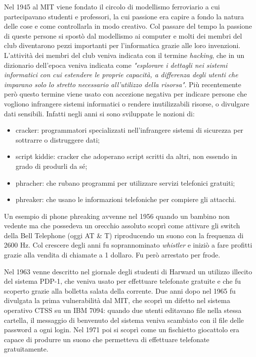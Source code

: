 Nel 1945 al MIT viene fondato il circolo di modellismo ferroviario a cui partecipavano studenti e professori, la cui passione era capire a fondo la natura delle cose e come controllarla in modo creativo. Col passare del tempo la passione di queste persone si spostò dal modellismo ai computer e molti dei membri del club diventarono pezzi importanti per l'informatica grazie alle loro invenzioni. L'attività dei membri del club veniva indicata con il termine \textit{hacking}, che in un dizionario dell'epoca veniva indicata come \textit{"esplorare i dettagli nei sistemi informatici con cui estendere le proprie capacità, a differenza degli utenti che imparano solo lo stretto necessario all'utilizzo della risorsa"}.  Più recentemente però questo termine viene usato con accezione negativa per indicare persone che vogliono infrangere sistemi informatici o rendere inutilizzabili risorse, o divulgare dati sensibili. Infatti negli anni si sono sviluppate le nozioni di:
\begin{itemize}
    \item cracker: programmatori specializzati nell'infrangere sistemi di sicurezza per sottrarre o distruggere dati;
    \item script kiddie: cracker che adoperano script scritti da altri, non essendo in grado di produrli da sé;
    \item phracher: che rubano programmi per utilizzare servizi telefonici gratuiti;
    \item phreaker: che usano le informazioni telefoniche per compiere gli attacchi.
\end{itemize}
Un esempio di phone phreaking avvenne nel 1956 quando un bambino non vedente ma che possedeva un orecchio assoluto scoprì come attivare gli switch della Bell Telephone (oggi AT \& T) riproducendo un suono con la frequenza di 2600 Hz. Col crescere degli anni fu soprannominato \textit{whistler} e iniziò a fare profitti grazie alla vendita di chiamate a 1 dollaro. Fu però arrestato per frode.

Nel 1963 venne descritto nel giornale degli studenti di Harward un utilizzo illecito del sistema PDP-1, che veniva usato per effettuare telefonate gratuite e che fu scoperto grazie alla bolletta salata della corrente. Due anni dopo nel 1965 fu divulgata la prima vulnerabilità dal MIT, che scoprì un difetto nel sistema operativo CTSS su un IBM 7094: quando due utenti editavano file nella stessa cartella, il messaggio di benvenuto del sistema veniva scambiato con il file delle password a ogni login. Nel 1971 poi si scoprì come un fischietto giocattolo era capace di produrre un suono che permetteva di effettuare telefonate gratuitamente.

